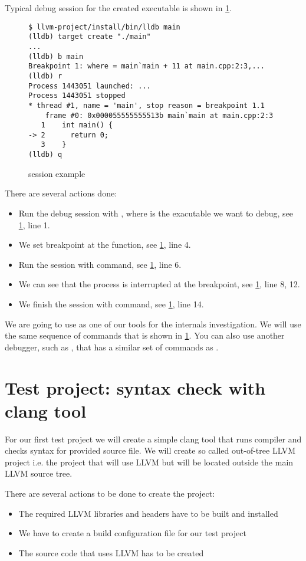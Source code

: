 Typical debug session for the created executable is shown in \cref{lis:lldb_session}.
\begin{figure}
\begin{verbatim}
$ llvm-project/install/bin/lldb main
(lldb) target create "./main"
...
(lldb) b main
Breakpoint 1: where = main`main + 11 at main.cpp:2:3,...
(lldb) r
Process 1443051 launched: ...
Process 1443051 stopped
* thread #1, name = 'main', stop reason = breakpoint 1.1
    frame #0: 0x000055555555513b main`main at main.cpp:2:3
   1    int main() {
-> 2      return 0;
   3    }
(lldb) q
\end{verbatim}
\caption{\lldb session example}
\label{lis:lldb_session}
\end{figure}
There are several actions done:
\begin{itemize}
  \item Run the debug session with , where  is the exacutable we want to debug, see
    \cref{lis:lldb_session}, line 1.
  \item We set breakpoint at the  function, see
    \cref{lis:lldb_session}, line 4.
  \item Run the session with  command, see
    \cref{lis:lldb_session}, line 6.
  \item We can see that the process is interrupted at the breakpoint, see
    \cref{lis:lldb_session}, line 8, 12.
  \item We finish the session with  command, see
    \cref{lis:lldb_session}, line 14.
\end{itemize}

We are going to use \lldb as one of our tools for the \clang internals
investigation. We will use the same sequence of commands that is shown in
\cref{lis:lldb_session}. You can also use another debugger, such as \gdb, that
has a similar set of commands as \lldb.

\section{Test project: syntax check with clang tool}
\label{sec:setup_test_project}
For our first test project we will create a simple clang tool that runs compiler
and checks syntax for provided source file. We will create so called out-of-tree
LLVM project i.e. the project that will use LLVM but will be located outside the
main LLVM source tree.

There are several actions to be done to create the project:
\begin{itemize}
\item The required LLVM libraries and headers have to be built and installed
\item We have to create a build configuration file for our test project
\item The source code that uses LLVM has to be created
\end{itemize}

